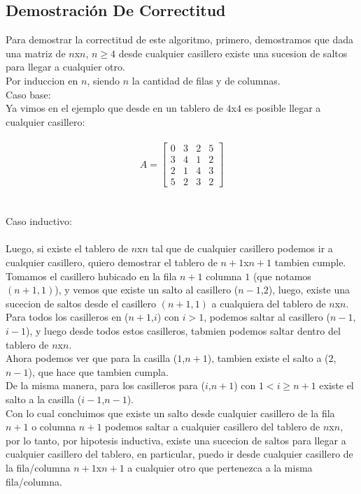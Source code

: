 \subsection{Demostraci\'on De Correctitud}
Para demostrar la correctitud de este algoritmo, primero, demostramos que dada una matriz de $n$x$n$, $n \geq 4$ desde cualquier casillero existe una sucesion de saltos para llegar a cualquier otro. 
\\
Por induccion en $n$, siendo $n$ la cantidad de filas y de columnas.
\\
Caso base:
\\
Ya vimos en el ejemplo que desde en un tablero de $4$x$4$ es posible llegar a cualquier casillero:
\\
\\
$$A = \begin{bmatrix}
      0 & 3 & 2 & 5   \\[0.3em]
      3 & 4 & 1 & 2   \\[0.3em]
      2 & 1 & 4 & 3   \\[0.3em]
      5 & 2 & 3 & 2 
\end{bmatrix}$$
\\
\\
Caso inductivo:
\\
\\
Luego, si existe el tablero de $n$x$n$ tal que de cualquier casillero podemos ir a cualquier casillero, quiero demostrar el tablero de $n+1$x$n+1$ tambien cumple.
\\
Tomamos el casillero hubicado en la fila $n+1$ columna $1$ (que notamos $(n+1,1)$), y vemos que existe un salto al casillero ($n-1$,$2$), luego, existe una sucecion de saltos desde el casillero $(n+1,1)$ a cualquiera del tablero de $n$x$n$.
\\
Para todos los casilleros en ($n+1$,$i$) con $i>1$, podemos saltar al casillero ($n-1$,$i-1$), y luego desde todos estos casilleros, tabmien podemos saltar dentro del tablero de $n$x$n$.
\\
Ahora podemos ver que para la casilla ($1$,$n+1$), tambien existe el salto a ($2$,$n-1$), que hace que tambien cumpla.
\\
De la misma manera, para los casilleros para ($i$,$n+1$) con $1< i \geq n+1$ existe el salto a la casilla ($i-1$,$n-1$).
\\
Con lo cual concluimos que existe un salto desde cualquier casillero de la fila $n+1$ o columna $n+1$ podemos saltar a cualquier casillero del tablero de $n$x$n$, por lo tanto, por hipotesis inductiva, existe una sucecion de saltos para llegar a cualquier casillero del tablero, en particular, puedo ir desde cualquier casillero de la fila/columna $n+1$x$n+1$ a cualquier otro que pertenezca a la misma fila/columna.
